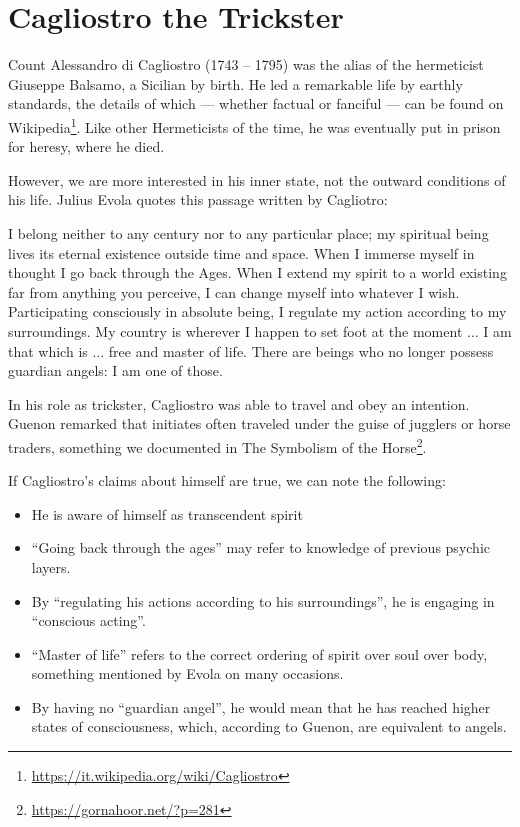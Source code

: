 \section{Cagliostro the Trickster}

Count Alessandro di Cagliostro (1743 -- 1795) was the alias of the hermeticist Giuseppe Balsamo, a Sicilian by birth. He led a remarkable life by earthly standards, the details of which --- whether factual or fanciful --- can be found on Wikipedia\footnote{\url{https://it.wikipedia.org/wiki/Cagliostro}}. Like other Hermeticists of the time, he was eventually put in prison for heresy, where he died.

However, we are more interested in his inner state, not the outward conditions of his life. Julius Evola quotes this passage written by Cagliotro:

\begin{quotex}
I belong neither to any century nor to any particular place; my spiritual being lives its eternal existence outside time and space. When I immerse myself in thought I go back through the Ages. When I extend my spirit to a world existing far from anything you perceive, I can change myself into whatever I wish. Participating consciously in absolute being, I regulate my action according to my surroundings. My country is wherever I happen to set foot at the moment ... I am that which is ... free and master of life. There are beings who no longer possess guardian angels: I am one of those.
\end{quotex}


In his role as trickster, Cagliostro was able to travel and obey an intention. Guenon remarked that initiates often traveled under the guise of jugglers or horse traders, something we documented in The Symbolism of the Horse\footnote{\url{https://gornahoor.net/?p=281}}.

If Cagliostro's claims about himself are true, we can note the following:

\begin{itemize}


\item He is aware of himself as transcendent spirit

\item ``Going back through the ages'' may refer to knowledge of previous psychic layers.

\item By ``regulating his actions according to his surroundings'', he is engaging in ``conscious acting''.

\item ``Master of life'' refers to the correct ordering of spirit over soul over body, something mentioned by Evola on many occasions.

\item By having no ``guardian angel'', he would mean that he has reached higher states of consciousness, which, according to Guenon, are equivalent to angels.
\end{itemize}



